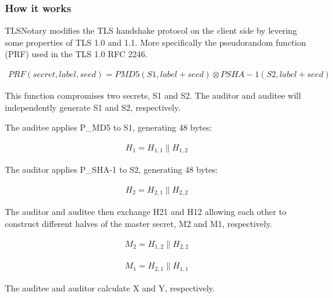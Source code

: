 \subsubsection{How it works}
TLSNotary modifies the TLS handshake protocol on the client side by levering some properties of TLS 1.0 and 1.1. More specifically the pseudorandom function (PRF) used in the TLS 1.0 RFC 2246.

\begin{ceqn}
    \begin{align}
        PRF(secret,label,seed) = PMD5(S1,label+seed) \otimes PSHA-1(S2,label+seed)
    \end{align}
\end{ceqn}

This function compromises two secrets, S1 and S2. The auditor and auditee will independently generate S1 and S2, respectively. 

The auditee applies P\_MD5 to S1, generating 48 bytes:

\begin{ceqn}
    \begin{align}
        H_{1} = H_{1,1} \parallel H_{1,2}
    \end{align}
\end{ceqn}

The auditor applies P\_SHA-1 to S2, generating 48 bytes:

\begin{ceqn}
    \begin{align}
        H_{2} = H_{2,1} \parallel H_{2,2}
    \end{align}
\end{ceqn}


The auditor and auditee then exchange H21 and H12 allowing each other to construct different halves of the master secret, M2 and M1, respectively.

\begin{ceqn}
    \begin{align}
        M_{2} = H_{1,2} \parallel H_{2,2}
    \end{align}
\end{ceqn}

\begin{ceqn}
    \begin{align}
        M_{1} = H_{2,1} \parallel H_{1,1}
    \end{align}
\end{ceqn}

The auditee and auditor calculate X and Y, respectively.

